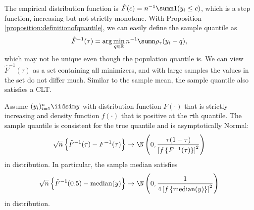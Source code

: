 The empirical distribution function is $\hat{F}(c)=n^{-1}\sumn1(y_{i}\leq c)$,
which is a step function, increasing but not strictly monotone. With
Proposition \ref{proposition:definitionofquantile}, we can easily define
the sample quantile as 
\[
\hat{F}^{-1}(\tau)=\arg\min_{q \in \mathbb{R}  }n^{-1}\sumn\rho_{\tau}(y_{i}-q),
\]
which may not be unique even though the population quantile is. We
can view $\hat{F}^{-1}(\tau)$ as a set containing all minimizers,
and with large samples the values in the set do not differ much. Similar
to the sample mean, the sample quantile also satisfies a CLT. 


\begin{theorem}\label{thm::sample-quantiles-asymptotics}
Assume $(y_{i})_{i=1}^{n}\iidsim y$ with distribution function $F(\cdot)$
that is strictly increasing and density function $f(\cdot)$ that
is positive at the $\tau$th quantile. The sample quantile
is consistent for the true quantile and is asymptotically Normal:
\[
\sqrt{n}\left\{ \hat{F}^{-1}(\tau)-F^{-1}(\tau)\right\} \rightarrow\N\left(0,\frac{\tau(1-\tau)}{\left[f\left\{ F^{-1}(\tau)\right\} \right]^{2}}\right)
\]
in distribution. In particular, the sample median satisfies
\[
\sqrt{n}\left\{ \hat{F}^{-1}(0.5)-\textup{median}(y)\right\} \rightarrow\N\left(0,\frac{1}{4\left[f\left\{ \textup{median}(y)\right\} \right]^{2}}\right)
\]
in distribution. 
\end{theorem}


